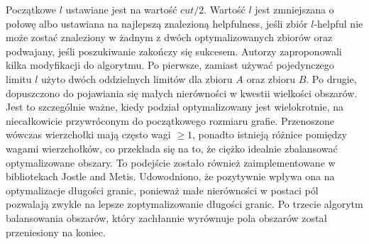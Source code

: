 Początkowe $l$ ustawiane jest na wartość $cut/2$.
Wartość $l$ jest zmniejszana o połowę albo ustawiana na najlepszą znalezioną helpfulness, jeśli zbiór $l$-helpful
nie może zostać znaleziony w żadnym z dwóch optymalizowanych zbiorów oraz podwajany, jeśli poszukiwanie
zakończy się sukcesem.
Autorzy \cite{1364754} zaproponowali kilka modyfikacji do algorytmu.
Po pierwsze, zamiast używać pojedynczego limitu $l$ użyto dwóch oddzielnych limitów dla zbioru $A$ oraz zbioru $B$.
Po drugie, dopuszczono do pojawiania się małych nierówności w kwestii wielkości obszarów.
Jest to szczególnie ważne, kiedy podział optymalizowany jest wielokrotnie, na niecałkowicie przywróconym
do początkowego rozmiaru grafie.
Przenoszone wówczas wierzchołki mają często wagi $\geq 1$, ponadto istnieją różnice pomiędzy wagami wierzchołków,
co przekłada się na to, że ciężko idealnie zbalansować optymalizowane obszary.
To podejście zostało również zaimplementowane w bibliotekach Jostle and Metis.
Udowodniono, że pozytywnie wpływa ona na optymalizacje długości granic, ponieważ małe nierówności w postaci pól pozwalają
zwykle na lepsze zoptymalizowanie długości granic.
Po trzecie algorytm balansowania obszarów, który zachłannie wyrównuje pola obszarów został przeniesiony na koniec.


